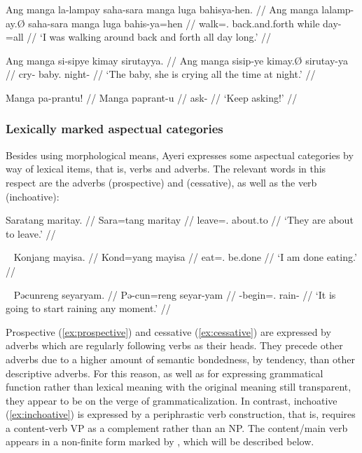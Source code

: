 \pex
\a\begingl
	\gla Ang manga la-lampay saha-sara manga luga bahisya-hen. //
	\glb Ang manga la\til{}lamp-ay.Ø saha-sara manga luga bahis-ya=hen //
	\glc \AgtT{} \Prog{} \Iter{}\til{}walk=\Fsg{}.\Top{} back.and.forth 
		\Dyn{} while day-\Loc{}=all //
	\glft `I was walking around back and forth all day long.' //
\endgl

\a\begingl
	\gla Ang manga si-sipye kimay sirutayya. //
	\glb Ang manga si\til{}sip-ye kimay.Ø sirutay-ya //
	\glc \AgtT{} \Prog{} \Iter{}\til{}cry-\TsgF{} baby.\Top{} 
		night-\Loc{} //
	\glft `The baby, she is crying all the time at night.' //
\endgl

\a\begingl
	\gla Manga pa-prantu! //
	\glb Manga pa\til{}prant-u //
	\glc \Prog{} \Iter{}\til{}ask-\Imp{} //
	\glft `Keep asking!' //
\endgl

\xe


\subsubsection{Lexically marked aspectual categories}

Besides using morphological means, Ayeri expresses some aspectual categories by 
way of lexical items, that is, verbs and adverbs. The relevant words in this 
respect are the adverbs  
(prospective) and  (cessative), as well as 
the verb  (inchoative):

\ex\label{ex:prospective}\begingl
	\gla Saratang maritay. //
	\glb Sara=tang maritay //
	\glc leave=\TplM{}.\Aarg{} about.to //
	\glft `They are about to leave.' //
\endgl\xe

\ex~\label{ex:cessative}\begingl
	\gla Konjang mayisa. //
	\glb Kond=yang mayisa //
	\glc eat=\Fsg.\Aarg{} be.done //
	\glft `I am done eating.' //
\endgl\xe

\ex~\label{ex:inchoative}\begingl
	\gla Pəcunreng seyaryam. //
	\glb Pə-cun=reng seyar-yam //
	\glc \NFut{}-begin=\TsgI{}.\Aarg{} rain-\Ptcp{} //
	\glft `It is going to start raining any moment.' //
\endgl\xe

Prospective  (\ref{ex:prospective}) and cessative 
 (\ref{ex:cessative}) are expressed by adverbs which are 
regularly following verbs as their heads. They precede other adverbs due to a 
higher amount of semantic bondedness, by tendency, than other descriptive 
adverbs. For this reason, as well as for expressing grammatical function rather 
than lexical meaning with the original meaning still transparent, they appear to 
be on the verge of grammaticalization. In contrast, inchoative 
 (\ref{ex:inchoative}) is expressed by a periphrastic verb 
construction, that is,  requires a content-verb VP as a 
complement rather than an NP. The content/main verb appears in a non-finite 
form marked by , which will be described below.

